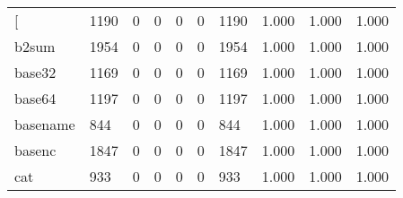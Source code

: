 \begin{longtable}{lp{2.0cm}p{2.0cm}p{2.0cm}p{2.0cm}p{2.0cm}p{2.0cm}p{2.0cm}p{2.0cm}p{2.0cm}}
\bottomrule
\endlastfoot
{[}         &                   1190 &                                  0 &                                 0 &                                0 &                                 0 &                            1190 &                                   1.000 &                                  1.000 &                                1.000 \\
b2sum     &                   1954 &                                  0 &                                 0 &                                0 &                                 0 &                            1954 &                                   1.000 &                                  1.000 &                                1.000 \\
base32    &                   1169 &                                  0 &                                 0 &                                0 &                                 0 &                            1169 &                                   1.000 &                                  1.000 &                                1.000 \\
base64    &                   1197 &                                  0 &                                 0 &                                0 &                                 0 &                            1197 &                                   1.000 &                                  1.000 &                                1.000 \\
basename  &                    844 &                                  0 &                                 0 &                                0 &                                 0 &                             844 &                                   1.000 &                                  1.000 &                                1.000 \\
basenc    &                   1847 &                                  0 &                                 0 &                                0 &                                 0 &                            1847 &                                   1.000 &                                  1.000 &                                1.000 \\
cat       &                    933 &                                  0 &                                 0 &                                0 &                                 0 &                             933 &                                   1.000 &                                  1.000 &                                1.000 \\

\end{longtable}
